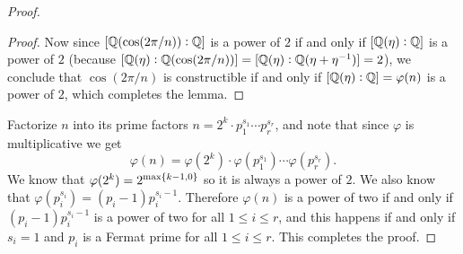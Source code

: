 \documentclass[11pt,a4paper]{article}
\begin{document}
\begin{proof}
\begin{proof}
  Now since $[\mathbb{Q}(\cos(2\pi/n)) : \mathbb{Q}]$ is a power of $2$ if and only
  if $[\mathbb{Q}(\eta) : \mathbb{Q}]$ is a power of $2$
  (because
  $[\mathbb{Q}(\eta) : \mathbb{Q}(\cos(2\pi/n))] = [\mathbb{Q}(\eta) : \mathbb{Q}(\eta+\eta^{-1})] = 2$),
  we conclude that $\cos(2\pi/n)$ is constructible if and only if
  $[\mathbb{Q}(\eta) : \mathbb{Q}] = \varphi(n)$ is a power of $2$,
  which completes the lemma.
  \end{proof}
  Factorize $n$ into its prime factors
  $n = 2^k \cdot p_1^{s_1} \cdots p_r^{s_r}$,
  and note that since $\varphi$ is multiplicative we get
  \[
    \varphi(n) =
    \varphi(2^k) \cdot \varphi(p_1^{s_1}) \cdots \varphi(p_r^{s_r}).
  \]
  We know that $\varphi(2^k) = 2^{\max\left\{k-1,0\right\}}$ so it is always
  a power of $2$.
  We also know that $\varphi(p_i^{s_i}) = (p_i - 1) p_i^{s_i - 1}$.
  Therefore $\varphi(n)$ is a power of two if and only if
  $(p_i - 1) p_i^{s_i - 1}$ is a power of two for all $1 \le i \le r$,
  and this happens if and only if $s_i = 1$ and $p_i$ is a Fermat
  prime for all $1 \le i \le r$.
  This completes the proof.
\end{proof}
\end{document}
